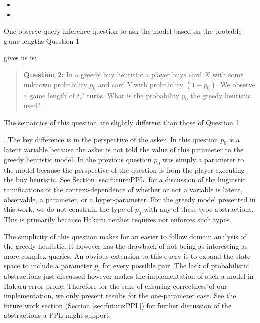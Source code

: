 \begin{itemize}
\item {}
\item {}
\end{itemize}

One observe-query inference question to ask the model based on the
probable game lengths Question 1 \ignore{\ref{quote:dominion-query}} gives us is:

\begin{quote} %
  {\bf Question 2: }
  In a greedy buy heuristic a player buys card $X$ with some unknown probability $p_0$
  and card $Y$ with probability $(1 - p_0)$. We observe a game length of $t_e'$
  turns. What is the probability $p_0$ the greedy heuristic used?
\end{quote}

The semantics of this question are slightly different than those of
Question 1 \ignore{\ref{quote:dominion-query}}. The key difference is in the
perspective of the asker. In this question $p_0$ is a latent variable
because the asker is not told the value of this parameter to the greedy
heuristic model. In the previous question $p_0$ was simply a parameter
to the model because the perspective of the question is from the player
executing the buy heuristic. See Section \ref{sec:future:PPL} for a
discussion of the linguistic ramifications of the context-dependence
of whether or not a variable is latent, observable, a parameter, or a
hyper-parameter. For the greedy model presented in this work, we do
not constrain the type of $p_0$ with any of these type abstractions.
This is primarily because Hakaru neither requires nor enforces such types.

The simplicity of this question makes for an easier to follow domain
analysis of the greedy heuristic. It however has the drawback of not being as
interesting as more complex queries. An obvious extension to this query
is to expand the state space to include a parameter $p_i$ for every possible
 pair. The lack of probabilistic abstractions
just discussed however makes the implementation of such a model in Hakaru
error-prone. Therefore for the sake of ensuring correctness of our implementation,
we only present results for the one-parameter case. See the future work
section (Section \ref{sec:future:PPL}) for further discussion of the
abstractions a PPL might support.

